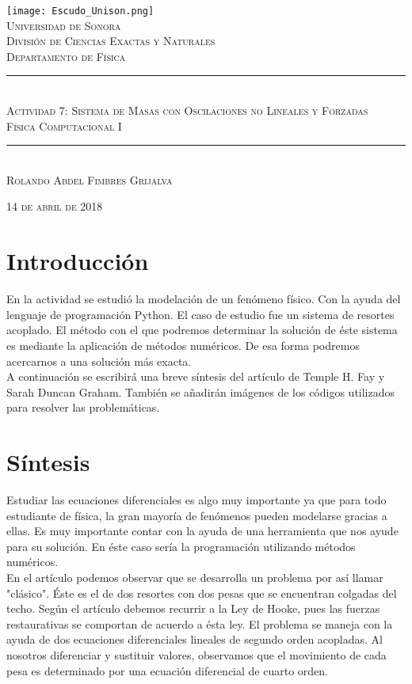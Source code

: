 \documentclass{article}
\newcommand{\HRule}{\rule{\linewidth}{0.5mm}}
\begin{document}
\begin{center}

\texttt{[image: Escudo\_Unison.png]}~\\[1cm]

\textsc{\LARGE Universidad de Sonora}\\[0.1cm]
\textsc{División de Ciencias Exactas y Naturales}\\[0.1cm]
\textsc{Departamento de Física}\\[1.5cm]

\HRule \\[0.4cm]
\textsc{Actividad 7: Sistema de Masas con Oscilaciones no Lineales y Forzadas}\\[0.1cm]
\textsc{Física Computacional I \\[0.1cm]}
\HRule \\[1.5cm]

\textsc{Rolando Abdel Fimbres Grijalva \\[1.0cm]}

\vfill
\textsc{14 de abril de 2018\\[0.1cm]}
\end{center}
\newpage
{}

\section{Introducción}
En la actividad se estudió la modelación de un fenómeno físico. Con la ayuda del lenguaje de programación Python. El caso de estudio fue un sistema de resortes acoplado. El método con el que podremos determinar la solución de éste sistema es mediante la aplicación de métodos numéricos. De esa forma podremos acercarnos a una solución más exacta.\\ 
A continuación se escribirá una breve síntesis del artículo de Temple H. Fay y Sarah Duncan Graham. También se añadirán imágenes de los códigos utilizados para resolver las problemáticas.
\section{Síntesis}
Estudiar las ecuaciones diferenciales es algo muy importante ya que para todo estudiante de física, la gran mayoría de fenómenos pueden modelarse gracias a ellas. Es muy importante contar con la ayuda de una herramienta que nos ayude para su solución. En éste caso sería la programación utilizando métodos numéricos.\\
En el artículo podemos observar que se desarrolla un problema por así llamar "clásico". Éste es el de dos resortes con dos pesas que se encuentran colgadas del techo. Según el artículo debemos recurrir a la Ley de Hooke, pues las fuerzas restaurativas se comportan de acuerdo a ésta ley. El problema se maneja con la ayuda de dos ecuaciones diferenciales lineales de segundo orden acopladas. Al nosotros diferenciar y sustituir valores, observamos que el movimiento de cada pesa es determinado por una ecuación diferencial de cuarto orden.\\
\end{document}
